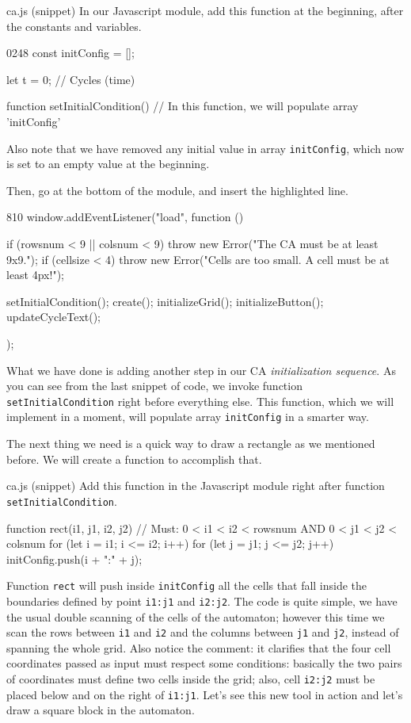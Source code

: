 \begin{programcode}{ca.js (snippet)}
In our Javascript module, add this function at the beginning, after the constants and variables.
\begin{codeh2}{0}{2}{4}{8}
const initConfig = [];

let t = 0; // Cycles (time)

function setInitialCondition() {
    // In this function, we will populate array 'initConfig'
}
\end{codeh2}
Also note that we have removed any initial value in array \texttt{initConfig}, which now is set
to an empty value at the beginning.

Then, go at the bottom of the module, and insert the highlighted line.
\begin{codeh1}{8}{10}
window.addEventListener("load", function () {
  if (rowsnum < 9 || colsnum < 9) {
    throw new Error("The CA must be at least 9x9.");
  }
  if (cellsize < 4) {
    throw new Error("Cells are too small. A cell must be at least 4px!");
  }

  setInitialCondition();
  create();
  initializeGrid();
  initializeButton();
  updateCycleText();
});
\end{codeh1}
\end{programcode}

What we have done is adding another step in our CA \textit{initialization sequence}. As you can see from
the last snippet of code, we invoke function \texttt{setInitialCondition} right before everything
else. This function, which we will implement in a moment, will populate array \texttt{initConfig}
in a smarter way.

The next thing we need is a quick way to draw a rectangle as we mentioned before. We will create
a function to accomplish that.

\begin{programcode}{ca.js (snippet)}
Add this function in the Javascript module right after function \texttt{setInitialCondition}.
\begin{code}
function rect(i1, j1, i2, j2) {
  // Must: 0 < i1 < i2 < rowsnum AND 0 < j1 < j2 < colsnum
  for (let i = i1; i <= i2; i++) {
    for (let j = j1; j <= j2; j++) {
      initConfig.push(i + ":" + j);
    }
  }
}
\end{code}
\end{programcode}

Function \texttt{rect} will push inside \texttt{initConfig} all the cells that fall inside the
boundaries defined by point \texttt{i1:j1} and \texttt{i2:j2}. The code is quite simple, we have
the usual double scanning of the cells of the automaton; however this time we scan the rows between
\texttt{i1} and \texttt{i2} and the columns between \texttt{j1} and \texttt{j2}, instead of
spanning the whole grid. Also notice the comment: it clarifies that the four cell coordinates
passed as input must respect some conditions: basically the two pairs of coordinates must define
two cells inside the grid; also, cell \texttt{i2:j2} must be placed below and on the right
of \texttt{i1:j1}.
Let's see this new tool in action and let's draw a square block in the automaton.

